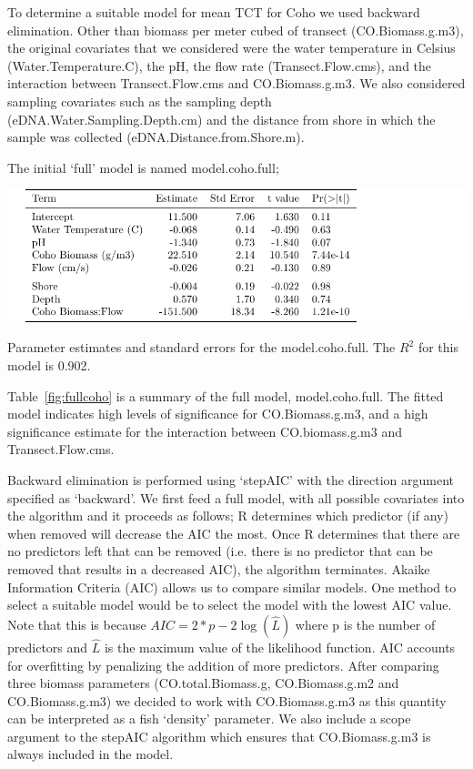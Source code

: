 To determine a suitable model for mean TCT for Coho we used backward elimination. Other than biomass per meter cubed of transect (CO.Biomass.g.m3), the original covariates that we considered were the water temperature in Celsius (Water.Temperature.C), the pH, the flow rate (Transect.Flow.cms), and the interaction between Transect.Flow.cms and CO.Biomass.g.m3. We also considered sampling covariates such as the sampling depth (eDNA.Water.Sampling.Depth.cm) and the distance from shore in which the sample was collected (eDNA.Distance.from.Shore.m).

\vspace{5mm}

The initial `full' model is named model.coho.full;

\vspace{5mm}

\begin{table}[H]
\includegraphics{Chapter5Images/cohofull.pdf}
\caption{Parameter estimates and standard errors for the model.coho.full. The $R^{2}$ for this model is 0.902. }
\label{fig:fullcoho}
\end{table}

Table~\ref{fig:fullcoho} is a summary of the full model, model.coho.full. The fitted model indicates high levels of significance for CO.Biomass.g.m3, and a high significance estimate for the interaction between CO.biomass.g.m3 and Transect.Flow.cms.

\vspace{5mm}

Backward elimination is performed using `stepAIC' \citep{MASS} with the direction argument specified as `backward'. We first feed a full model, with all possible covariates into the algorithm and it proceeds as follows; R determines which predictor (if any) when removed will decrease the AIC the most.  Once R determines that there are no predictors left that can be removed (i.e. there is no predictor that can be removed that results in a decreased AIC), the algorithm terminates. Akaike Information Criteria (AIC) allows us to compare similar models. One method to select a suitable model would be to select the model with the lowest AIC value. Note that this is because $AIC=2*p-2\log(\hat L)$ where p is the number of predictors and $\hat{L}$ is the maximum value of the likelihood function. 
AIC accounts for overfitting by penalizing the addition of more predictors. After comparing three biomass parameters (CO.total.Biomass.g, CO.Biomass.g.m2 and CO.Biomass.g.m3) we decided to work with CO.Biomass.g.m3 as this quantity can be interpreted as a fish `density' parameter. We also include a scope argument to the stepAIC algorithm which ensures that CO.Biomass.g.m3 is always included in the model.




